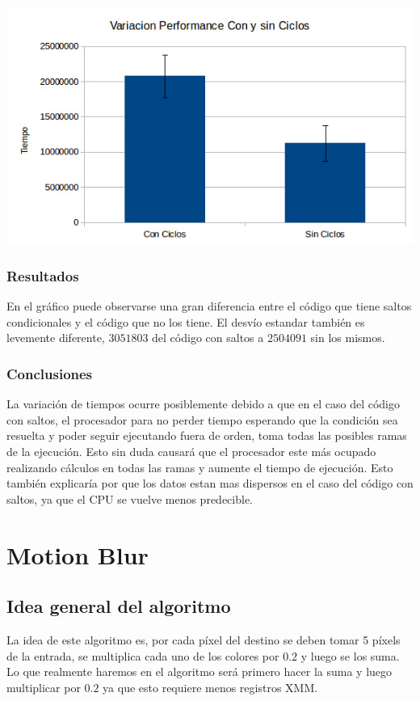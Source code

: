 \documentclass[a4paper]{article}
\begin{document}
  \begin{center}
  \includegraphics[scale=0.66]{Graficos3.1/per.png}
  \end{center}

\subsubsection{Resultados}
En el gráfico puede observarse una gran diferencia entre el código que tiene saltos condicionales y el código que no los tiene. El desvío estandar también es levemente diferente, $3051803$ del código con saltos a $2504091$ sin los mismos.

\subsubsection{Conclusiones}

La variación de tiempos ocurre posiblemente debido a que en el caso del código con saltos, el procesador para no perder tiempo esperando que la condición sea resuelta y poder seguir ejecutando fuera de orden, toma todas las posibles ramas de la ejecución. Esto sin duda causará que el procesador este más ocupado realizando cálculos en todas las ramas y aumente el tiempo de ejecución. Esto también explicaría por que los datos estan mas dispersos en el caso del código con saltos, ya que el CPU se vuelve menos predecible.

\newpage
\section{Motion Blur}
\subsection{Idea general del algoritmo}
La idea de este algoritmo es, por cada píxel del destino se deben tomar 5 píxels de la entrada, se multiplica cada uno de los colores por $0.2$ y luego se los suma. Lo que realmente haremos en el algoritmo será primero hacer la suma y luego multiplicar por $0.2$ ya que esto requiere menos registros XMM.
\end{document}
